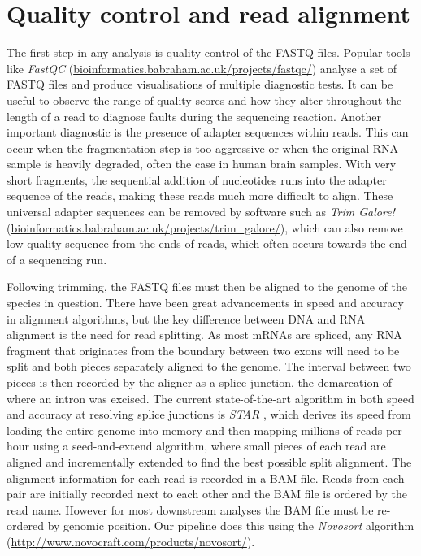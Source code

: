 \section{Quality control and read alignment}
The first step in any analysis is quality control of the FASTQ files. Popular tools like \textit{FastQC} (\url{bioinformatics.babraham.ac.uk/projects/fastqc/}) analyse a set of FASTQ files and produce visualisations of multiple diagnostic tests. It can be useful to observe the range of quality scores and how they alter throughout the length of a read to diagnose faults during the sequencing reaction. Another important diagnostic is the presence of adapter sequences within reads. This can occur when the fragmentation step is too aggressive or when the original RNA sample is heavily degraded, often the case in human brain samples. With very short fragments, the sequential addition of nucleotides runs into the adapter sequence of the reads, making these reads much more difficult to align. These universal adapter sequences can be removed by software such as \textit{Trim Galore!} (\url{bioinformatics.babraham.ac.uk/projects/trim_galore/}), which can also remove low quality sequence from the ends of reads, which often occurs towards the end of a sequencing run. 

Following trimming, the FASTQ files must then be aligned to the genome of the species in question. There have been great advancements in speed and accuracy in alignment algorithms, but the key difference between DNA and RNA alignment is the need for read splitting. As most mRNAs are spliced, any RNA fragment that originates from the boundary between two exons will need to be split and both pieces separately aligned to the genome. The interval between two pieces is then recorded by the aligner as a splice junction, the demarcation of where an intron was excised. The current state-of-the-art algorithm in both speed and accuracy at resolving splice junctions is \textit{STAR} \citep{Dobin2013-ra}, which derives its speed from loading the entire genome into memory and then mapping millions of reads per hour using a seed-and-extend algorithm, where small pieces of each read are aligned and incrementally extended to find the best possible split alignment. The alignment information for each read is recorded in a BAM file. Reads from each pair are initially recorded next to each other and the BAM file is ordered by the read name. However for most downstream analyses the BAM file must be re-ordered by genomic position. Our pipeline does this using the \textit{Novosort} algorithm (\url{http://www.novocraft.com/products/novosort/}). 

